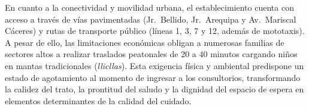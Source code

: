 En cuanto a la conectividad y movilidad urbana, el establecimiento cuenta con acceso a través de vías pavimentadas (Jr.~Bellido, Jr.~Arequipa y Av.~Mariscal Cáceres) y rutas de transporte público (líneas 1, 3, 7 y 12, además de mototaxis). A pesar de ello, las limitaciones económicas obligan a numerosas familias de sectores altos a realizar traslados peatonales de 20 a 40 minutos cargando niños en mantas tradicionales (\textit{llicllas}). Esta exigencia física y ambiental predispone un estado de agotamiento al momento de ingresar a los consultorios, transformando la calidez del trato, la prontitud del saludo y la dignidad del espacio de espera en elementos determinantes de la calidad del cuidado.

